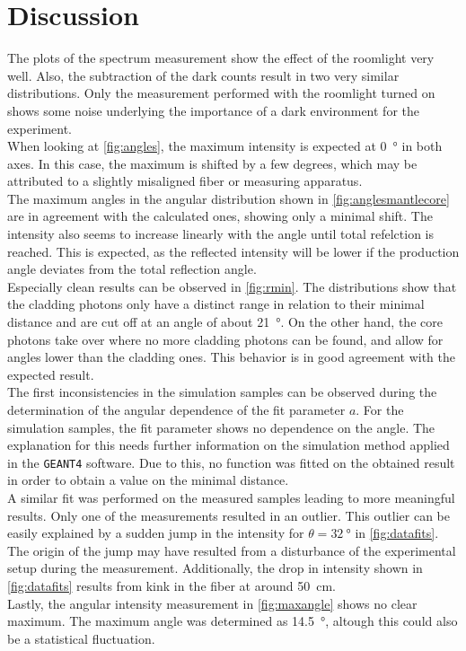 \section{Discussion}
\label{sec:Discussion}

The plots of the spectrum measurement show the effect of the roomlight very well. Also, the subtraction of the dark counts result in two very similar distributions. Only the measurement performed with the roomlight turned on shows some noise underlying the importance of a dark environment for the experiment.\\
When looking at \autoref{fig:angles}, the maximum intensity is expected at \qty{0}{\degree} in both axes. In this case, the maximum is shifted by a few degrees, which may be attributed to a slightly misaligned fiber or measuring apparatus.\\
The maximum angles in the angular distribution shown in \autoref{fig:anglesmantlecore} are in agreement with the calculated ones, showing only a minimal shift. 
The intensity also seems to increase linearly with the angle until total refelction is reached. This is expected, as the reflected intensity will be lower if the production angle deviates from the total reflection angle.\\
Especially clean results can be observed in \autoref{fig:rmin}. The distributions show that the cladding photons only have a distinct range in relation to their minimal distance and are cut off at an angle of about \qty{21}{\degree}. On the other hand, the core photons take over where no more cladding photons can be found, and allow for angles lower than the cladding ones. This behavior is in good agreement with the expected result.\\
The first inconsistencies in the simulation samples can be observed during the determination of the angular dependence of the fit parameter $a$. For the simulation samples, the fit parameter shows no dependence on the angle. The explanation for this needs further information on the simulation method applied in the \texttt{GEANT4} software. Due to this, no function was fitted on the obtained result in order to obtain a value on the minimal distance.\\
A similar fit was performed on the measured samples leading to more meaningful results. Only one of the measurements resulted in an outlier. 
This outlier can be easily explained by a sudden jump in the intensity for $\theta=\qty{32}{\degree}$ in \autoref{fig:datafits}. 
The origin of the jump may have resulted from a disturbance of the experimental setup during the measurement. 
Additionally, the drop in intensity shown in \autoref{fig:datafits} results from kink in the fiber at around \qty{50}{\centi\meter}.\\
Lastly, the angular intensity measurement in \autoref{fig:maxangle} shows no clear maximum. The maximum angle was determined as \qty{14.5}{\degree}, altough this could also be a statistical fluctuation.
